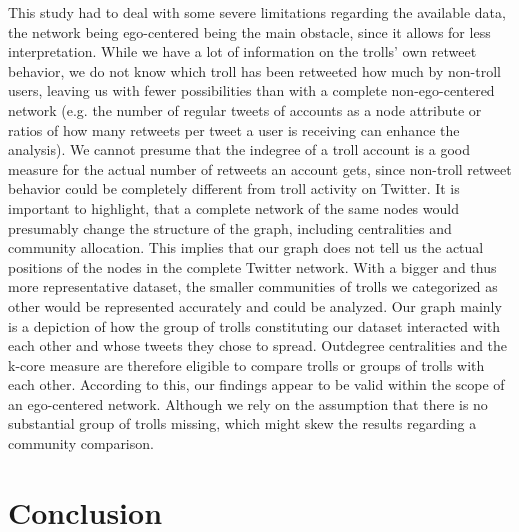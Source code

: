 \documentclass[12pt, titlepage=true, toc=bib]{scrartcl}
\begin{document}
This study had to deal with some severe limitations regarding the available data, the network being ego-centered being the main obstacle, since it allows for less interpretation. While we have a lot of information on the trolls' own retweet behavior, we do not know which troll has been retweeted how much by non-troll users, leaving us with fewer possibilities than with a complete non-ego-centered network (e.g. the number of regular tweets of accounts as a node attribute or ratios of how many retweets per tweet a user is receiving can enhance the analysis). We cannot presume that the indegree of a troll account is a good measure for the actual number of retweets an account gets, since non-troll retweet behavior could be completely different from troll activity on Twitter. It is important to highlight, that a complete network of the same nodes would presumably change the structure of the graph, including centralities and community allocation. This implies that our graph does not tell us the actual positions of the nodes in the complete Twitter network. With a bigger and thus more representative dataset, the smaller communities of trolls we categorized as other would be represented accurately and could be analyzed. Our graph mainly is a depiction of how the group of trolls constituting our dataset interacted with each other and whose tweets they chose to spread. Outdegree centralities and the k-core measure are therefore eligible to compare trolls or groups of trolls with each other. According to this, our findings appear to be valid within the scope of an ego-centered network. Although we rely on the assumption that there is no substantial group of trolls missing, which might skew the results regarding a community comparison.


\section{Conclusion}
\end{document}
